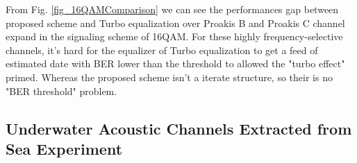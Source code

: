 \documentclass[conference]{IEEEtran}
\begin{document}
From Fig. \ref{fig_16QAMComparison} we can see the performances gap between proposed scheme and Turbo equalization over Proakis B and Proakis C channel expand in the signaling scheme of 16QAM. For these highly frequency-selective channels, it's hard for the equalizer of Turbo equalization to get a feed of estimated date with BER lower than the threshold to allowed the "turbo effect" primed. Whereas the proposed scheme isn't a iterate structure, so their is no "BER threshold" problem.%

\subsection{Underwater Acoustic Channels Extracted from Sea Experiment}

\end{document}
